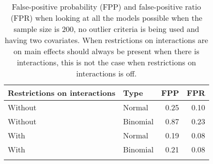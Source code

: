 \begin{longtable}{llrr}
\caption{False-positive probability (FPP) and false-positive ratio (FPR) when looking at all the models possible when the sample size is 200, no outlier criteria is being used and having two covariates. When restrictions on interactions are on main effects should always be present when there is interactions, this is not the case when restrictions on interactions is off.} \\ 
  \hline
Restrictions on interactions & Type & FPP & FPR \\ 
  \hline
Without & Normal & 0.25 & 0.10 \\ 
  Without & Binomial & 0.87 & 0.23 \\ 
  With & Normal & 0.19 & 0.08 \\ 
  With & Binomial & 0.21 & 0.08 \\ 
   \hline
\hline
\label{tab:resultFull}
\end{longtable}
